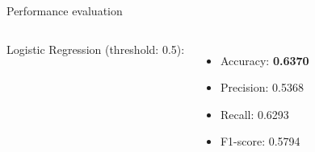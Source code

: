 \documentclass[aspectratio=169,xcolor=dvipsnames,handout]{beamer}
\begin{document}
\begin{frame}{Performance evaluation}

    \begin{columns}[c]

        Logistic Regression (threshold: 0.5):
        \begin{itemize}
            \item Accuracy: \textbf{0.6370}
            \item Precision: 0.5368
            \item Recall: 0.6293
            \item F1-score: 0.5794
        \end{itemize}
    

\end{columns}
\end{frame}
\end{document}
